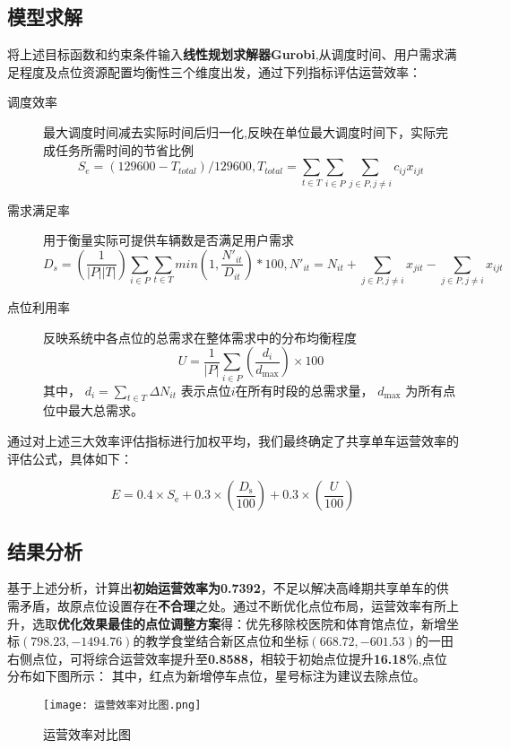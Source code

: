 \documentclass[withoutpreface,bwprint]{cumcmthesis}
\begin{document}
\subsection{模型求解}
将上述目标函数和约束条件输入\textbf{线性规划求解器Gurobi},从调度时间、用户需求满足程度及点位资源配置均衡性三个维度出发，通过下列指标评估运营效率：
\begin{description}
    \item[调度效率 ] 最大调度时间减去实际时间后归一化,反映在单位最大调度时间下，实际完成任务所需时间的节省比例
    \begin{equation}
        S_{e} = (129600 - T_{total}) / 129600, T_{total} = \sum_{t \in T} \sum_{i \in P} \sum_{j \in P, j \neq i} c_{ij} x_{ijt}
    \end{equation}
    \item[需求满足率 ] 用于衡量实际可提供车辆数是否满足用户需求
    \begin{equation}
        D_{s} = (\frac{1}{|P||T|}) \sum_{i \in P} \sum_{t \in T} min(1, \frac{N'_{it}}{D_{it}}) * 100, N'_{it} = N_{it} + \sum_{j \in P, j \neq i} x_{jit} - \sum_{j \in P, j \neq i} x_{ijt}
    \end{equation}
    \item[点位利用率 ] 反映系统中各点位的总需求在整体需求中的分布均衡程度
    \begin{equation}
    U = \frac{1}{|P|} \sum_{i \in P} \left( \frac{d_i}{d_{\max}} \right) \times 100
    \end{equation}
    其中， $d_i = \sum_{t \in T} \Delta N_{it}$  表示点位$  i  $在所有时段的总需求量， $d_{\max}$  为所有点位中最大总需求。
\end{description}

通过对上述三大效率评估指标进行加权平均，我们最终确定了共享单车运营效率的评估公式，具体如下：

\begin{equation} 
    E = 0.4 \times S_{\text{e}} + 0.3 \times \left(\frac{D_{\text{s}}}{100}\right) + 0.3 \times \left(\frac{U}{100}\right)
\end{equation}
\subsection{结果分析}
基于上述分析，计算出\textbf{初始运营效率为0.7392}，不足以解决高峰期共享单车的供需矛盾，故原点位设置存在\textbf{不合理}之处。通过不断优化点位布局，运营效率有所上升，选取\textbf{优化效果最佳的点位调整方案}得：优先移除校医院和体育馆点位，新增坐标$(798.23, -1494.76)$的教学食堂结合新区点位和坐标$(668.72,-601.53)$的一田右侧点位，可将综合运营效率提升至\textbf{0.8588}，相较于初始点位提升\textbf{16.18\%},点位分布如下图所示：
其中，红点为新增停车点位，星号标注为建议去除点位。
\begin{figure}
    \centering
    \texttt{[image: 运营效率对比图.png]}
    \caption{运营效率对比图}
    \label{fig:enter-label}
\end{figure}
\end{document}
